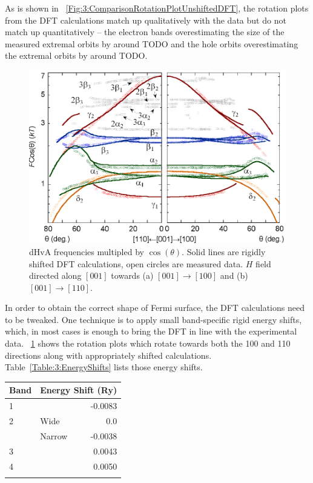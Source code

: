 As is shown in \fig~\ref{Fig:3:ComparisonRotationPlotUnshiftedDFT}, the rotation plots from the DFT calculations match up qualitatively with the data but do not match up quantitatively -- the electron bands overestimating the size of the measured extremal orbits by around TODO and the hole orbits overestimating the extremal orbits by around TODO. 

\begin{figure}[h!]
    \begin{center}
        \includegraphics[scale=0.7]{Chapter3-dHvABaFe2P2/Figures/AngleDepMeasurements/AngleSweepRigidShift/AngleSweepRigidShift}
        \caption{dHvA frequencies multipled by $\cos(\theta)$. Solid lines are rigidly shifted DFT calculations, open circles are measured data. $H$ field directed along $[001]$ towards (a) $[001]\rightarrow[100]$ and (b) $[001]\rightarrow[110]$.}
        \label{Fig:3:AngleSweepRigidShift}
    \end{center}
\end{figure}

In order to obtain the correct shape of Fermi surface, the DFT calculations need to be tweaked. One technique is to apply small band-specific rigid energy shifts, which, in most cases is enough to bring the DFT in line with the experimental data. \fig~\ref{Fig:3:AngleSweepRigidShift} shows the rotation plots which rotate towards both the 100 and 110 directions along with appropriately shifted calculations. Table~\ref{Table:3:EnergyShifts} lists those energy shifts.

\medskip

\begin{center}
    \begin{tabular}[h!]{llr}
\toprule
Band    & \multicolumn{2}{l}{Energy Shift (\unit{Ry})} \\
\midrule
1       &       & -0.0083      \\
2       & Wide  & 0.0          \\
        & Narrow & -0.0038     \\
3       &       & 0.0043       \\
4       &       & 0.0050        \\
\bottomrule
    \label{Table:3:EnergyShifts}
    \end{tabular}
\end{center}

